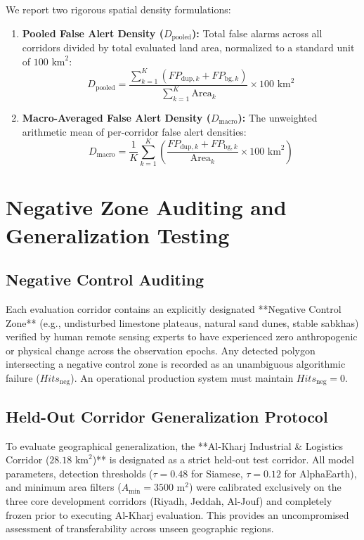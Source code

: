 We report two rigorous spatial density formulations:
\begin{enumerate}
    \item \textbf{Pooled False Alert Density ($D_{\text{pooled}}$):} Total false alarms across all corridors divided by total evaluated land area, normalized to a standard unit of $100\text{ km}^2$:
    \begin{equation}
        D_{\text{pooled}} = \frac{\sum_{k=1}^K \left(FP_{\text{dup}, k} + FP_{\text{bg}, k}\right)}{\sum_{k=1}^K \text{Area}_k} \times 100\text{ km}^2
        \label{eq:pooled_density}
    \end{equation}
    \item \textbf{Macro-Averaged False Alert Density ($D_{\text{macro}}$):} The unweighted arithmetic mean of per-corridor false alert densities:
    \begin{equation}
        D_{\text{macro}} = \frac{1}{K} \sum_{k=1}^K \left( \frac{FP_{\text{dup}, k} + FP_{\text{bg}, k}}{\text{Area}_k} \times 100\text{ km}^2 \right)
        \label{eq:macro_density}
    \end{equation}
\end{enumerate}

\section{Negative Zone Auditing and Generalization Testing}
\label{sec:exp_negative_zones}
\subsection{Negative Control Auditing}
Each evaluation corridor contains an explicitly designated **Negative Control Zone** (e.g., undisturbed limestone plateaus, natural sand dunes, stable sabkhas) verified by human remote sensing experts to have experienced zero anthropogenic or physical change across the observation epochs. Any detected polygon intersecting a negative control zone is recorded as an unambiguous algorithmic failure ($Hits_{\text{neg}}$). An operational production system must maintain $Hits_{\text{neg}} = 0$.

\subsection{Held-Out Corridor Generalization Protocol}
To evaluate geographical generalization, the **Al-Kharj Industrial & Logistics Corridor ($28.18\text{ km}^2$)** is designated as a strict held-out test corridor. All model parameters, detection thresholds ($\tau=0.48$ for Siamese, $\tau=0.12$ for AlphaEarth), and minimum area filters ($A_{\min}=3500\text{ m}^2$) were calibrated exclusively on the three core development corridors (Riyadh, Jeddah, Al-Jouf) and completely frozen prior to executing Al-Kharj evaluation. This provides an uncompromised assessment of transferability across unseen geographic regions.
\newpage
